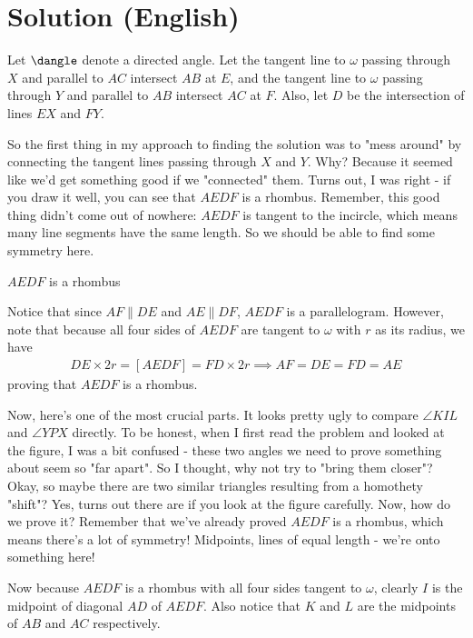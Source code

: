 \section{Solution (English)}

Let $\dangle$ denote a directed angle.
Let the tangent line to $\omega$ passing through $X$ and parallel to $AC$ intersect $AB$ at $E$, and the tangent line to $\omega$ passing through $Y$ and parallel to $AB$ intersect $AC$ at $F$. Also, let $D$ be the intersection of lines $EX$ and $FY$.
\begin{comment*}
    So the first thing in my approach to finding the solution was to "mess around" by connecting the tangent lines passing through $X$ and $Y$. Why? Because it seemed like we'd get something good if we "connected" them. Turns out, I was right - if you draw it well, you can see that $AEDF$ is a rhombus. Remember, this good thing didn't come out of nowhere: $AEDF$ is tangent to the incircle, which means many line segments have the same length. So we should be able to find some symmetry here.
\end{comment*}
\begin{lemmarev}
    $AEDF$ is a rhombus
    \begin{buktilemma}
        Notice that since $AF \parallel DE$ and $AE \parallel DF$, $AEDF$ is a parallelogram. However, note that because all four sides of $AEDF$ are tangent to $\omega$ with $r$ as its radius, we have
        \begin{align*}
            DE \times 2r = [AEDF] = FD \times 2r \implies AF =DE = FD = AE 
        \end{align*}
        proving that $AEDF$ is a rhombus.
    \end{buktilemma}
\end{lemmarev}
\begin{comment*}
    Now, here's one of the most crucial parts. It looks pretty ugly to compare $\angle KIL$ and $\angle YPX$ directly. To be honest, when I first read the problem and looked at the figure, I was a bit confused - these two angles we need to prove something about seem so "far apart". So I thought, why not try to "bring them closer"? Okay, so maybe there are two similar triangles resulting from a homothety "shift"? Yes, turns out there are if you look at the figure carefully. Now, how do we prove it? Remember that we've already proved $AEDF$ is a rhombus, which means there's a lot of symmetry! Midpoints, lines of equal length - we're onto something here!
\end{comment*}
Now because $AEDF$ is a rhombus with all four sides tangent to $\omega$, clearly $I$ is the midpoint of diagonal $AD$ of $AEDF$. Also notice that $K$ and $L$ are the midpoints of $AB$ and $AC$ respectively.
